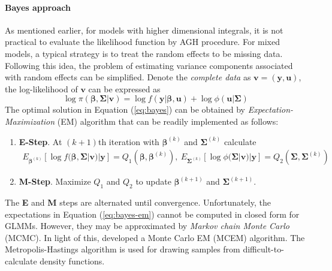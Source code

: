 		\paragraph{Bayes approach}
		As mentioned earlier, for models with higher dimensional integrals, it is not practical to evaluate the likelihood function by AGH procedure. For mixed models, a typical strategy is to treat the random effects to be missing data. Following this idea, the problem of estimating variance components associated with random effects can be simplified. Denote the \textit{complete data} as $\bm v = (\bm y, \bm u)$, the log-likelihood of $\bm v$ can be expressed as 
		\begin{equation}\label{eq:bayes}
		\log \pi(\bm \beta , \bm \Sigma|\bm v) = \log f(\bm y|\bm \beta, \bm u) + \log \phi(\bm u|\bm \Sigma)
		\end{equation}  
		The optimal solution in Equation (\ref{eq:bayes}) can be obtained by \textit{Expectation-Maximization} (EM) algorithm that can be readily implemented as follows:
		\begin{enumerate}
			\item \textbf{E-Step}. At $(k+1)$th iteration with $\bm \beta^{(k)}$ and $\bm\Sigma^{(k)}$   calculate 
			\begin{equation}\label{eq:bayes-em}
			\begin{aligned}
			E_{\bm \beta^{(k)}}[\log f(\bm \beta , \bm \Sigma|\bm v)|\bm y]= Q_1(\bm \beta, \bm \beta^{(k)}), ~
			E_{\bm \Sigma^{(k)}}[\log \phi(\bm \Sigma|\bm v)|\bm y]= Q_2(\bm \Sigma, \bm \Sigma^{(k)})
			\end{aligned}
			\end{equation}
			\item \textbf{M-Step}. Maximize $Q_1$ and $Q_2$ to update  $\bm \beta^{(k+1)}$ and $\bm\Sigma^{(k+1)}$.
		\end{enumerate}
		The \textbf{E} and \textbf{M} steps are alternated until convergence. Unfortunately, the expectations in Equation (\ref{eq:bayes-em}) cannot be computed in closed form for GLMMs. However, they may be approximated by \textit{Markov chain Monte Carlo} (MCMC). In light of this, \cite{mcculloch1997maximum} developed a Monte Carlo EM (MCEM) algorithm. The Metropolis-Hastings algorithm is used for drawing samples from difficult-to-calculate density functions.
		
